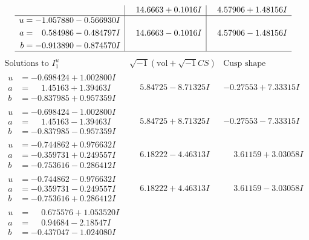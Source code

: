 \documentclass[1p]{elsarticle_modified}
\theoremstyle{definition}
\newcommand{\I}{\sqrt{-1}}
\begin{document}
$$\begin{array}{c|c|c}
 & \phantom{-}14.6663 + 0.1016 I & \phantom{-}4.57906 + 1.48156 I \\ \hline\begin{aligned}
u &= -1.057880 - 0.566930 I \\
a &= \phantom{-}0.584986 - 0.484797 I \\
b &= -0.913890 - 0.874570 I\end{aligned}
 & \phantom{-}14.6663 - 0.1016 I & \phantom{-}4.57906 - 1.48156 I\\
 \hline 
 \end{array}$$\newpage$$\begin{array}{c|c|c}  
\text{Solutions to }I^u_{1}& \I (\text{vol} + \sqrt{-1}CS) & \text{Cusp shape}\\
 \hline 
\begin{aligned}
u &= -0.698424 + 1.002800 I \\
a &= \phantom{-}1.45163 + 1.39463 I \\
b &= -0.837985 + 0.957359 I\end{aligned}
 & \phantom{-}5.84725 - 8.71325 I & -0.27553 + 7.33315 I \\ \hline\begin{aligned}
u &= -0.698424 - 1.002800 I \\
a &= \phantom{-}1.45163 - 1.39463 I \\
b &= -0.837985 - 0.957359 I\end{aligned}
 & \phantom{-}5.84725 + 8.71325 I & -0.27553 - 7.33315 I \\ \hline\begin{aligned}
u &= -0.744862 + 0.976632 I \\
a &= -0.359731 + 0.249557 I \\
b &= -0.753616 - 0.286412 I\end{aligned}
 & \phantom{-}6.18222 - 4.46313 I & \phantom{-}3.61159 + 3.03058 I \\ \hline\begin{aligned}
u &= -0.744862 - 0.976632 I \\
a &= -0.359731 - 0.249557 I \\
b &= -0.753616 + 0.286412 I\end{aligned}
 & \phantom{-}6.18222 + 4.46313 I & \phantom{-}3.61159 - 3.03058 I \\ \hline\begin{aligned}
u &= \phantom{-}0.675576 + 1.053520 I \\
a &= \phantom{-}0.94684 - 2.18547 I \\
b &= -0.437047 - 1.024080 I\end{aligned}

\end{array}$$
\end{document}
